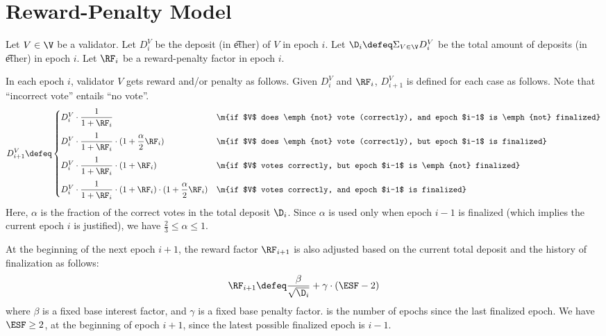 \section{Reward-Penalty Model}

Let $V \in \V$ be a validator.
Let $D^V_i$ be the deposit (in \t{ether}) of $V$ in epoch $i$.
Let $\D_i \defeq \Sigma_{V \in \V} D^V_i$ be the total amount of deposits (in \t{ether}) in epoch $i$.
Let $\RF_i$ be a reward-penalty factor in epoch $i$.

In each epoch $i$, validator $V$ gets reward and/or penalty as follows.
Given $D^V_i$ and $\RF_i$, $D^V_{i+1}$ is defined for each case as follows.
Note that ``incorrect vote'' entails ``no vote''.
\[
D^V_{i+1} \defeq
\begin{cases}
         D^V_i \cdot \dfrac{1}{1 + \RF_i}                                                       & \m{if $V$ does \emph{not} vote (correctly), and epoch $i-1$ is \emph{not} finalized}
\\[11pt] D^V_i \cdot \dfrac{1}{1 + \RF_i}                   \cdot (1 + \dfrac{\alpha}{2} \RF_i) & \m{if $V$ does \emph{not} vote (correctly), but epoch $i-1$ is finalized}
\\[11pt] D^V_i \cdot \dfrac{1}{1 + \RF_i} \cdot (1 + \RF_i)                                     & \m{if $V$ votes correctly, but epoch $i-1$ is \emph{not} finalized}
\\[11pt] D^V_i \cdot \dfrac{1}{1 + \RF_i} \cdot (1 + \RF_i) \cdot (1 + \dfrac{\alpha}{2} \RF_i) & \m{if $V$ votes correctly, and epoch $i-1$ is finalized}
\end{cases}
\]
Here, $\alpha$ is the fraction of the correct votes in the total deposit $\D_i$.
Since $\alpha$ is used only when epoch $i-1$ is finalized (which implies the current epoch $i$ is justified),
we have $\frac{2}{3} \le \alpha \le 1$.

At the beginning of the next epoch $i+1$,
the reward factor $\RF_{i+1}$ is also adjusted based on the current total deposit and the history of finalization as follows:
\[
\RF_{i+1} \defeq \dfrac{\beta}{\sqrt{\D_{i}}} + \gamma \cdot (\ESF - 2)
\]
where $\beta$ is a fixed base interest factor,
and $\gamma$ is a fixed base penalty factor.
\ESF is the number of epochs since the last finalized epoch.
We have $\ESF \ge 2$,
at the beginning of epoch $i+1$,
since the latest possible finalized epoch is $i-1$.

